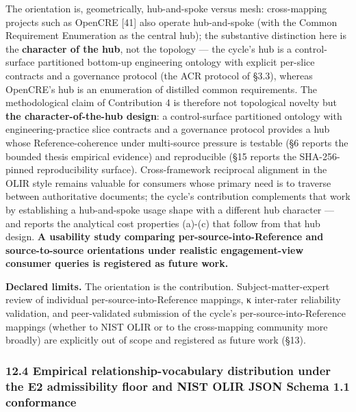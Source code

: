 \documentclass[
]{article}
\begin{document}
The orientation is, geometrically, hub-and-spoke versus mesh:
cross-mapping projects such as OpenCRE {[}41{]} also operate
hub-and-spoke (with the Common Requirement Enumeration as the central
hub); the substantive distinction here is the \textbf{character of the
hub}, not the topology --- the cycle's hub is a control-surface
partitioned bottom-up engineering ontology with explicit per-slice
contracts and a governance protocol (the ACR protocol of §3.3), whereas
OpenCRE's hub is an enumeration of distilled common requirements. The
methodological claim of Contribution 4 is therefore not topological
novelty but \textbf{the character-of-the-hub design}: a control-surface
partitioned ontology with engineering-practice slice contracts and a
governance protocol provides a hub whose Reference-coherence under
multi-source pressure is testable (§6 reports the bounded thesis
empirical evidence) and reproducible (§15 reports the SHA-256-pinned
reproducibility surface). Cross-framework reciprocal alignment in the
OLIR style remains valuable for consumers whose primary need is to
traverse between authoritative documents; the cycle's contribution
complements that work by establishing a hub-and-spoke usage shape with a
different hub character --- and reports the analytical cost properties
(a)-(c) that follow from that hub design. \textbf{A usability study
comparing per-source-into-Reference and source-to-source orientations
under realistic engagement-view consumer queries is registered as future
work.}

\textbf{Declared limits.} The orientation is the contribution.
Subject-matter-expert review of individual per-source-into-Reference
mappings, κ inter-rater reliability validation, and peer-validated
submission of the cycle's per-source-into-Reference mappings (whether to
NIST OLIR or to the cross-mapping community more broadly) are explicitly
out of scope and registered as future work (§13).

\subsubsection{12.4 Empirical relationship-vocabulary distribution under
the E2 admissibility floor and NIST OLIR JSON Schema 1.1
conformance}\label{empirical-relationship-vocabulary-distribution-under-the-e2-admissibility-floor-and-nist-olir-json-schema-1.1-conformance}
\end{document}
